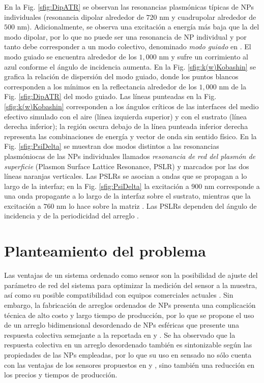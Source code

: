 	
En la Fig.  \ref{sfig:DipATR}  se observan las resonancias plasmónicas típicas de NPs individuales (resonancia dipolar alrededor de $720$ nm y cuadrupolar alrededor de $500$ nm).  Adicionalmente, se observa una excitación a energía más baja que la del modo dipolar, por lo que no puede ser una resonancia de NP individual y por tanto debe corresponder a un modo colectivo, denominado \emph{modo guiado} en  \cite{kabashin2009plasmonic}.  El modo guiado se encuentra alrededor de los $1,000$ nm y sufre un corrimiento al azul conforme el ángulo de incidencia aumenta.  En la Fig.  \ref{sfig:k(w)Kobashin} se grafica la relación de dispersión del modo guiado, donde los puntos blancos corresponden a los mínimos en la reflectancia alrededor de los $1,000$ nm de la Fig.  \ref{sfig:DipATR} del modo guiado.  Las líneas punteadas en la Fig.   \ref{sfig:k(w)Kobashin} corresponden a los ángulos críticos de las interfaces del medio efectivo simulado con el aire (línea izquierda superior) y con el sustrato (línea derecha inferior); la región oscura debajo de la línea punteada inferior derecha representa las combinaciones de energía y vector de onda sin sentido físico.  En la Fig.  \ref{sfig:PsiDelta} se muestran dos modos distintos a las resonancias plasmóniocas de las NPs individuales llamados \emph{resonancia de red del plasmón de superficie} (Plasmon Surface Lattice Resonance, PSLR) \cite{danilov2018ultra} y marcados por las dos líneas naranjas verticales.  Las PSLRs se asocian a ondas que se propagan a lo largo de la interfaz; en la Fig.  \ref{sfig:PsiDelta} la excitación a $900$ nm corresponde a una onda propagante a lo largo de la interfaz sobre el  sustrato, mientras que la excitación a $760$ nm lo hace sobre la matriz \cite{danilov2018ultra}.  Las PSLRs dependen del  ángulo de incidencia y de la periodicidad del arreglo \cite{danilov2018ultra}.   

\section*{Planteamiento del problema}


Las ventajas de un sistema ordenado como sensor son la posibilidad de ajuste del parámetro de red del sistema para optimizar la medición del sensor a la muestra, así como su posible compatibilidad con equipos comerciales actuales \cite{kabashin2009plasmonic}.  Sin embargo, la fabricaci\'on de arreglos ordenados de NPs presenta una complicaci\'on t\'ecnica de alto costo y largo tiempo de producción, por lo que se propone el uso de un arreglo bidimensional desordenado de NPs esféricas que presente una respuesta colectiva semejante a la reportada en \cite{kabashin2009plasmonic} y \cite{danilov2018ultra}.  Se ha observado que la respuesta colectiva en un arreglo desordenado también es sintonizable según las propiedades de las NPs empleadas, por lo que su uso en sensado no sólo cuenta con las ventajas de los sensores propuestos en \cite{kabashin2009plasmonic} y \cite{danilov2018ultra}, sino también una reducción en los precios y tiempos de producción. 

